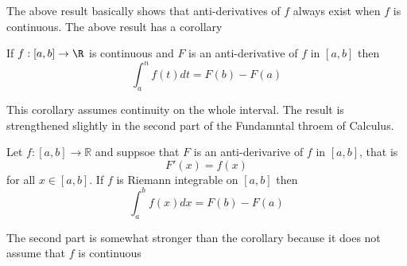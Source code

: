 	The above result basically shows that anti-derivatives of $f$ always exist when $f$ is continuous.	The above result has a corollary
	
	\begin{corollary}
		If $f : [a, b] \to \R$ is continuous and $F$ is an anti-derivative of $f$ in $[a, b]$ then $$\int_{a}^n f(t) dt = F(b) - F(a)$$
	\end{corollary}
	
	This corollary assumes continuity on the whole interval. The result is strengthened slightly in the second part of the Fundamntal throem of Calculus.
	
	\begin{theorem}
		Let $f : [a, b] \to \mathbb{R}$ and suppsoe that $F$ is an anti-derivarive of $f$ in $[a, b]$, that is $$F'(x) = f(x)$$ for all $x \in [a, b]$. If $f$ is Riemann integrable on $[a, b]$ then $$\int_{a}^bf(x) dx = F(b)-F(a)$$
	\end{theorem}
	
	The second part is somewhat stronger than the corollary because it does not assume that $f$ is continuous

